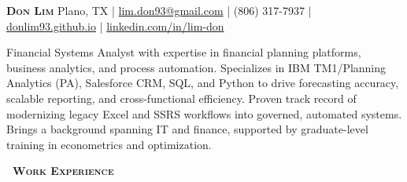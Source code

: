 \documentclass[a4paper,11pt]{article}
\newcommand{\header} [1] {
    {\textsc{\textbf{\Large{\xrfill[0.5ex]{0.5pt}~#1~\xrfill[0.5ex]{0.5pt}}}}}
}
\begin{document}
\vspace*{-0.45in}
\fontsize{10.0}{11}\selectfont

\begin{raggedright}
    {\Huge\textbf{\textsc{Don Lim}}} \hfill Plano, TX |
\href{mailto:lim.don93@gmail.com}{lim.don93@gmail.com} | (806) 317-7937 | \href{https://donlim93.github.io/}{donlim93.github.io} | \href{https://www.linkedin.com/in/lim-don/}{linkedin.com/in/lim-don} \\ \vspace{2mm}
\end{raggedright}

Financial Systems Analyst with expertise in financial planning platforms, business analytics, and process automation. Specializes in IBM TM1/Planning Analytics (PA), Salesforce CRM, SQL, and Python to drive forecasting accuracy, scalable reporting, and cross-functional efficiency. Proven track record of modernizing legacy Excel and SSRS workflows into governed, automated systems. Brings a background spanning IT and finance, supported by graduate-level training in econometrics and optimization.

\vspace{2mm}
\header{Work Experience}
\end{document}
